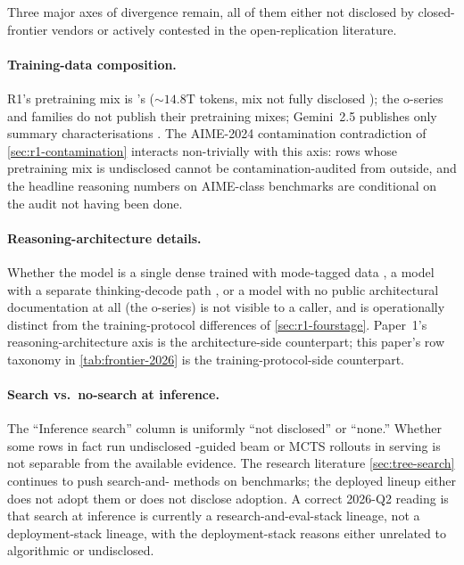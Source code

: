 Three major axes of divergence remain, all of them either not
disclosed by closed-frontier vendors or actively contested in the
open-replication literature.

\paragraph{Training-data composition.} R1's pretraining mix is
's ($\sim\!14.8\text{T}$ tokens, mix not fully disclosed
\citep[\S 2]{deepseek-r1}); the o-series and  families do not
publish their pretraining mixes; Gemini~2.5 publishes only summary
characterisations . The AIME-2024 contamination
contradiction of \cref{sec:r1-contamination} interacts non-trivially
with this axis: rows whose pretraining mix is undisclosed cannot be
contamination-audited from outside, and the headline reasoning numbers
on AIME-class benchmarks are conditional on the audit not having been
done.

\paragraph{Reasoning-architecture details.} Whether the model is a
single dense  trained with mode-tagged data
, a model with a separate thinking-decode
path , or a model with no
public architectural documentation at all (the o-series) is not
visible to a caller, and is operationally distinct from the
training-protocol differences of \cref{sec:r1-fourstage}. Paper~1's
reasoning-architecture axis is the architecture-side counterpart;
this paper's row taxonomy in \cref{tab:frontier-2026} is the
training-protocol-side counterpart.

\paragraph{Search vs.\ no-search at inference.} The ``Inference
search'' column is uniformly ``not disclosed'' or ``none.'' Whether
some rows in fact run undisclosed -guided beam or MCTS rollouts in
serving is not separable from the available evidence. The research
literature \cref{sec:tree-search} continues to push search-and-
methods on benchmarks; the deployed lineup either does not adopt them
or does not disclose adoption. A correct 2026-Q2 reading is that
search at inference is currently a research-and-eval-stack lineage,
not a deployment-stack lineage, with the deployment-stack reasons
either unrelated to algorithmic  or undisclosed.

